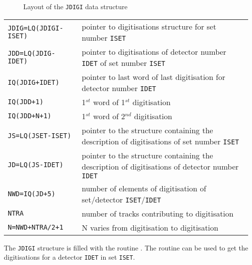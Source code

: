      
     

\begin{figure}[hbt]
     \centering
     \caption{Layout of the {\tt JDIGI} data structure}
     \label{fg:hits399-1}
\end{figure}

\begin{tabular}{lp{10cm}}
\tt JDIG=LQ(JDIGI-ISET) & pointer to digitisations structure for set 
number {\tt ISET}\\
\tt JDD=LQ(JDIG-IDET) & pointer to digitisations of detector number
{\tt IDET} of set number {\tt ISET} \\
\tt IQ(JDIG+IDET) & pointer to last word of last digitisation for detector
number {\tt IDET} \\
\tt IQ(JDD+1) & 1$^{st}$ word of 1$^{st}$ digitisation \\
\tt IQ(JDD+N+1) & 1$^{st}$ word of 2$^{nd}$ digitisation\\
\tt JS=LQ(JSET-ISET) & pointer to the structure containing the description
of digitisations of set number {\tt ISET} \\
\tt JD=LQ(JS-IDET) & pointer to the structure containing the description
of digitisations of detector number {\tt IDET} \\
\tt NWD=IQ(JD+5) & number of elements of digitisation of set/detector
{\tt ISET}/{\tt IDET}  \\
\tt NTRA & number of tracks contributing to digitisation\\
\tt N=NWD+NTRA/2+1 & N varies from digitisation to digitisation 
\end{tabular}

The {\tt JDIGI} structure is filled with the routine .
The routine  can be used to get the digitisations for
a detector {\tt IDET} in set {\tt ISET}.
 

